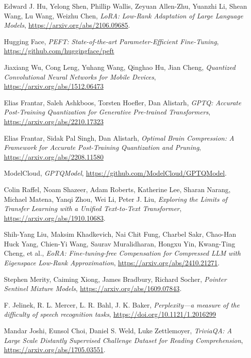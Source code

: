 \begin{thebibliography}{9}
	Edward J. Hu, Yelong Shen, Phillip Wallis, Zeyuan Allen-Zhu, Yuanzhi Li, Shean Wang, Lu Wang, Weizhu Chen,
	\textit{LoRA: Low-Rank Adaptation of Large Language Models},
	\url{https://arxiv.org/abs/2106.09685}.

	Hugging Face,
	\textit{PEFT: State-of-the-art Parameter-Efficient Fine-Tuning},
	\url{https://github.com/huggingface/peft}

	Jiaxiang Wu, Cong Leng, Yuhang Wang, Qinghao Hu, Jian Cheng,
	\textit{Quantized Convolutional Neural Networks for Mobile Devices},
	\url{https://arxiv.org/abs/1512.06473}

	Elias Frantar, Saleh Ashkboos, Torsten Hoefler, Dan Alistarh,
	\textit{GPTQ: Accurate Post-Training Quantization for Generative Pre-trained Transformers},
	\url{https://arxiv.org/abs/2210.17323}

	Elias Frantar, Sidak Pal Singh, Dan Alistarh,
	\textit{Optimal Brain Compression: A Framework for Accurate Post-Training Quantization and Pruning},
	\url{https://arxiv.org/abs/2208.11580}

	ModelCloud,
	\textit{GPTQModel},
	\url{https://github.com/ModelCloud/GPTQModel}.

	Colin Raffel, Noam Shazeer, Adam Roberts, Katherine Lee, Sharan Narang, Michael Matena, Yanqi Zhou, Wei Li, Peter J. Liu,
	\textit{Exploring the Limits of Transfer Learning with a Unified Text-to-Text Transformer},
	\url{https://arxiv.org/abs/1910.10683}.

	Shih-Yang Liu, Maksim Khadkevich, Nai Chit Fung, Charbel Sakr, Chao-Han Huck Yang, Chien-Yi Wang, Saurav Muralidharan, Hongxu Yin, Kwang-Ting Cheng, et al.,
	\textit{EoRA: Fine-tuning-free Compensation for Compressed LLM with Eigenspace Low-Rank Approximation},
	\url{https://arxiv.org/abs/2410.21271}.

	Stephen Merity, Caiming Xiong, James Bradbury, Richard Socher,
	\textit{Pointer Sentinel Mixture Models},
	\url{https://arxiv.org/abs/1609.07843}.

	F. Jelinek, R. L. Mercer, L. R. Bahl, J. K. Baker,
	\textit{Perplexity—a measure of the difficulty of speech recognition tasks},
	\url{https://doi.org/10.1121/1.2016299}

	Mandar Joshi, Eunsol Choi, Daniel S. Weld, Luke Zettlemoyer,
	\textit{TriviaQA: A Large Scale Distantly Supervised Challenge Dataset for Reading Comprehension},
	\url{https://arxiv.org/abs/1705.03551}.


\end{thebibliography}